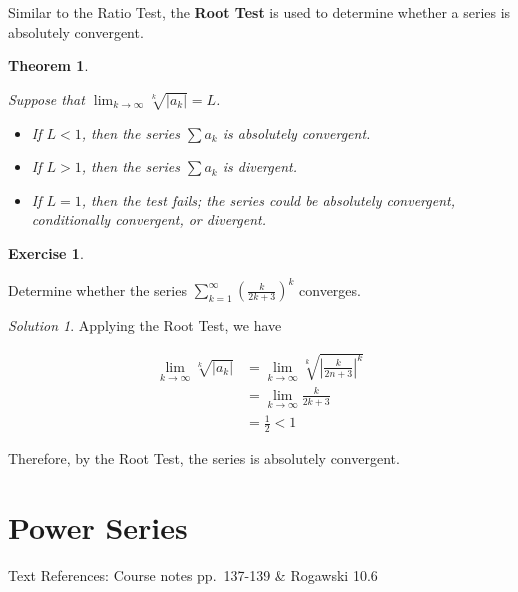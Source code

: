 \documentclass[
]{book}
\providecommand{\tightlist}{%
  \setlength{\itemsep}{0pt}\setlength{\parskip}{0pt}}
\newtheorem{theorem}{Theorem}[chapter]
\theoremstyle{definition}
\theoremstyle{definition}
\theoremstyle{definition}
\newtheorem{exercise}{Exercise}[chapter]
\theoremstyle{definition}
\theoremstyle{remark}
\newtheorem*{solution}{Solution}
\begin{document}
Similar to the Ratio Test, the \textbf{Root Test} is used to determine whether a series is absolutely convergent.

\begin{theorem}
\protect\hypertarget{thm:unlabeled-div-232}{}\label{thm:unlabeled-div-232}

Suppose that \(\displaystyle \lim_{k\to\infty} \sqrt[k]{|a_k|}=L\).

\begin{itemize}
\tightlist
\item
  If \(L<1\), then the series \(\displaystyle \sum a_k\) is absolutely convergent.
\item
  If \(L>1\), then the series \(\displaystyle \sum a_k\) is divergent.
\item
  If \(L=1\), then the test fails; the series could be absolutely convergent, conditionally convergent, or divergent.
\end{itemize}

\end{theorem}

\begin{exercise}
\protect\hypertarget{exr:unlabeled-div-233}{}\label{exr:unlabeled-div-233}

Determine whether the series \(\displaystyle \sum_{k=1}^\infty \left(\frac{k}{2k+3} \right)^k\) converges.

\end{exercise}

\begin{solution}

Applying the Root Test, we have

\begin{align*}
\lim_{k\to\infty} \sqrt[k]{|a_k|} &= \lim_{k\to\infty}\sqrt[k]{\left|\frac{k}{2n+3}\right|^k} \\
&= \lim_{k\to\infty} \frac{k}{2k+3}\\
&= \frac{1}{2}<1
\end{align*}

Therefore, by the Root Test, the series is absolutely convergent.

\end{solution}

\hypertarget{lec-31}{%
\chapter{Power Series}\label{lec-31}}

Text References: Course notes pp.~137-139 \& Rogawski 10.6
\end{document}
